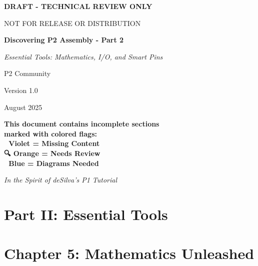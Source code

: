 \documentclass[11pt]{book}
\begin{document}
\begin{titlepage}
\centering

{\huge\bfseries\color{red}DRAFT - TECHNICAL REVIEW ONLY\par}
\vspace{0.5cm}
{\large\color{red}NOT FOR RELEASE OR DISTRIBUTION\par}
\vspace{1cm}

\vspace*{2cm}
{\Huge\bfseries Discovering P2 Assembly - Part 2\par}
\vspace{0.5cm}
{\Large\itshape Essential Tools: Mathematics, I/O, and Smart Pins\par}
\vspace{2cm}
{\large P2 Community\par}
\vspace{1cm}
{\large\color{red}Version 1.0\par}
\vspace{0.5cm}
{\large August 2025\par}
\vspace{1cm}

\begin{tcolorbox}[colback=yellow!20,colframe=red!50,boxrule=2pt]
\centering\bfseries
This document contains incomplete sections\\marked with colored flags:\\[0.5em]
🚧 Violet = Missing Content\\  
🔍 Orange = Needs Review\\
🎨 Blue = Diagrams Needed
\end{tcolorbox}

\vfill
{\small\itshape In the Spirit of deSilva's P1 Tutorial\par}
\end{titlepage}

\tableofcontents
\clearpage

\hypertarget{part-ii-essential-tools}{%
\section{Part II: Essential Tools}\label{part-ii-essential-tools}}

\hypertarget{chapter-5-mathematics-unleashed}{%
\section{Chapter 5: Mathematics
Unleashed}\label{chapter-5-mathematics-unleashed}}
\end{document}
